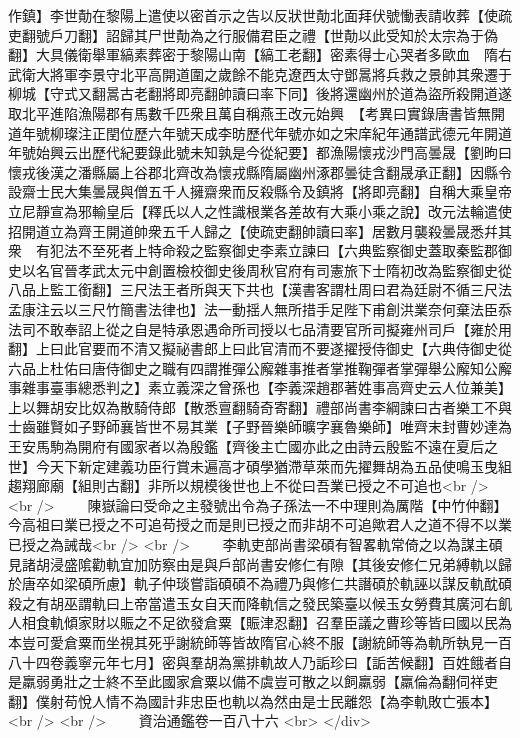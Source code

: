 作鎮】李世勣在黎陽上遣使以密首示之告以反狀世勣北面拜伏號慟表請收葬【使疏吏翻號戶刀翻】詔歸其尸世勣為之行服備君臣之禮【世勣以此受知於太宗為于偽翻】大具儀衛舉軍縞素葬密于黎陽山南【縞工老翻】密素得士心哭者多歐血　隋右武衛大將軍李景守北平高開道圍之歲餘不能克遼西太守鄧暠將兵救之景帥其衆遷于柳城【守式又翻暠古老翻將即亮翻帥讀曰率下同】後將還幽州於道為盜所殺開道遂取北平進陷漁陽郡有馬數千匹衆且萬自稱燕王改元始興　【考異曰實錄唐書皆無開道年號柳璨注正閏位歷六年號天成李昉歷代年號亦如之宋庠紀年通譜武德元年開道年號始興云出歷代紀要錄此號未知孰是今從紀要】都漁陽懷戎沙門高曇晟【劉昫曰懷戎後漢之潘縣屬上谷郡北齊改為懷戎縣隋屬幽州涿郡曇徒含翻晟承正翻】因縣令設齋士民大集曇晟與僧五千人擁齋衆而反殺縣令及鎮將【將即亮翻】自稱大乘皇帝立尼靜宣為邪輸皇后【釋氏以人之性識根業各差故有大乘小乘之說】改元法輪遣使招開道立為齊王開道帥衆五千人歸之【使疏吏翻帥讀曰率】居數月襲殺曇晟悉幷其衆　有犯法不至死者上特命殺之監察御史李素立諫曰【六典監察御史蓋取秦監郡御史以名官晉孝武太元中創置檢校御史後周秋官府有司憲旅下士隋初改為監察御史從八品上監工銜翻】三尺法王者所與天下共也【漢書客謂杜周曰君為廷尉不循三尺法孟康注云以三尺竹簡書法律也】法一動揺人無所措手足陛下甫創洪業奈何棄法臣忝法司不敢奉詔上從之自是特承恩遇命所司授以七品清要官所司擬雍州司戶【雍於用翻】上曰此官要而不清又擬祕書郎上曰此官清而不要遂擢授侍御史【六典侍御史從六品上杜佑曰唐侍御史之職有四謂推彈公廨雜事推者掌推鞠彈者掌彈舉公廨知公廨事雜事臺事總悉判之】素立義深之曾孫也【李義深趙郡著姓事高齊史云人位兼美】上以舞胡安比奴為散騎侍郎【散悉亶翻騎奇寄翻】禮部尚書李綱諫曰古者樂工不與士齒雖賢如子野師襄皆世不易其業【子野晉樂師曠字襄魯樂師】唯齊末封曹妙達為王安馬駒為開府有國家者以為殷鑑【齊後主亡國亦此之由詩云殷監不遠在夏后之世】今天下新定建義功臣行賞未遍高才碩學猶滯草萊而先擢舞胡為五品使鳴玉曳組趨翔廊廟【組則古翻】非所以規模後世也上不從曰吾業已授之不可追也<br />
<br />
　　陳嶽論曰受命之主發號出令為子孫法一不中理則為厲階【中竹仲翻】今高祖曰業已授之不可追苟授之而是則已授之而非胡不可追歟君人之道不得不以業已授之為誡哉<br />
<br />
　　李軌吏部尚書梁碩有智畧軌常倚之以為謀主碩見諸胡浸盛隂勸軌宜加防察由是與戶部尚書安修仁有隙【其後安修仁兄弟縛軌以歸於唐卒如梁碩所慮】軌子仲琰嘗詣碩碩不為禮乃與修仁共譖碩於軌誣以謀反軌酖碩殺之有胡巫謂軌曰上帝當遣玉女自天而降軌信之發民築臺以候玉女勞費其廣河右飢人相食軌傾家財以賑之不足欲發倉粟【賑津忍翻】召羣臣議之曹珍等皆曰國以民為本豈可愛倉粟而坐視其死乎謝統師等皆故隋官心終不服【謝統師等為軌所執見一百八十四卷義寧元年七月】密與羣胡為黨排軌故人乃詬珍曰【詬苦候翻】百姓餓者自是羸弱勇壯之士終不至此國家倉粟以備不虞豈可散之以飼羸弱【羸倫為翻伺祥吏翻】僕射苟悅人情不為國計非忠臣也軌以為然由是士民離怨【為李軌敗亡張本】<br />
<br />
　　資治通鑑卷一百八十六  <br>
   </div> 

